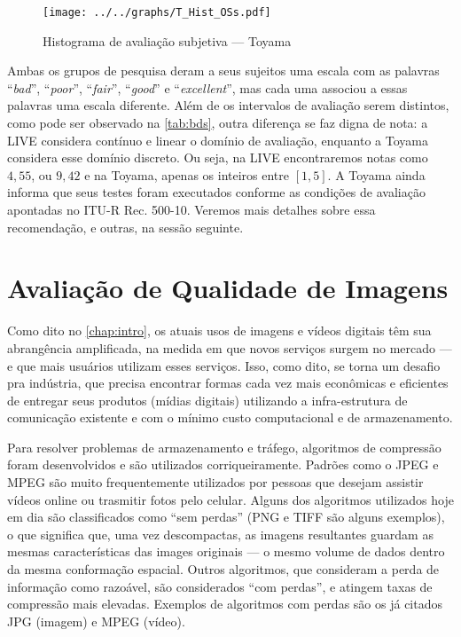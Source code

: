 \begin{figure}[htb]
	\centering
	\begin{minipage}{.8\textwidth}
		\centering
		\caption{Histograma de avaliação subjetiva --- Toyama}\label{graf:toyaHist}
		\texttt{[image: ../../graphs/T\_Hist\_OSs.pdf]}
	\end{minipage}
\end{figure}

Ambas os grupos de pesquisa deram a seus sujeitos uma escala com as palavras ``\emph{bad}'', ``\emph{poor}'', ``\emph{fair}'', ``\emph{good}'' e ``\emph{excellent}'', mas cada uma associou a essas palavras uma escala diferente. Além de os intervalos de avaliação serem distintos, como pode ser observado na \autoref{tab:bds}, outra diferença se faz digna de nota: a LIVE considera contínuo e linear o domínio de avaliação, enquanto a Toyama considera esse domínio discreto. Ou seja, na LIVE encontraremos notas como $4,55$, ou $9,42$ e na Toyama, apenas os inteiros entre $[1,5]$. A Toyama ainda informa que seus testes foram executados conforme as condições de avaliação apontadas no ITU-R Rec. 500-10. Veremos mais detalhes sobre essa recomendação, e outras, na sessão seguinte.

\section{Avaliação de Qualidade de Imagens}

Como dito no \autoref{chap:intro}, os atuais usos de imagens e vídeos digitais têm sua abrangência amplificada, na medida em que novos serviços surgem no mercado --- e que mais usuários utilizam esses serviços. Isso, como dito, se torna um desafio pra indústria, que precisa encontrar formas cada vez mais econômicas e eficientes de entregar seus produtos (mídias digitais) utilizando a infra-estrutura de comunicação existente e com o mínimo custo computacional e de armazenamento.

Para resolver problemas de armazenamento e tráfego, algoritmos de compressão foram desenvolvidos e são utilizados corriqueiramente. Padrões como o JPEG e MPEG são muito frequentemente utilizados por pessoas que desejam assistir vídeos online ou trasmitir fotos pelo celular. Alguns dos algoritmos utilizados hoje em dia são classificados como ``sem perdas'' (PNG e TIFF são alguns exemplos), o que significa que, uma vez descompactas, as imagens resultantes guardam as mesmas características das images originais --- o mesmo volume de dados dentro da mesma conformação espacial. Outros algoritmos, que consideram a perda de informação como razoável, são considerados ``com perdas'', e atingem taxas de compressão mais elevadas. Exemplos de algoritmos com perdas são os já citados JPG (imagem) e MPEG (vídeo).

